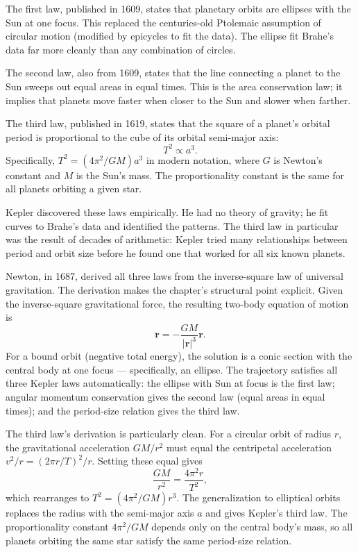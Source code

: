 The first law, published in 1609, states that planetary orbits are ellipses
with the Sun at one focus. This replaced the centuries-old Ptolemaic
assumption of circular motion (modified by epicycles to fit the data). The
ellipse fit Brahe's data far more cleanly than any combination of circles.

The second law, also from 1609, states that the line connecting a planet
to the Sun sweeps out equal areas in equal times. This is the area
conservation law; it implies that planets move faster when closer to the
Sun and slower when farther.

The third law, published in 1619, states that the square of a planet's
orbital period is proportional to the cube of its orbital semi-major axis:
\[
T^2 \propto a^3.
\label{eq:chapter6-kepler-third}
\]
Specifically, $T^2 = (4\pi^2/GM) a^3$ in modern notation, where $G$ is
Newton's constant and $M$ is the Sun's mass. The proportionality constant
is the same for all planets orbiting a given star.

Kepler discovered these laws empirically. He had no theory of gravity; he
fit curves to Brahe's data and identified the patterns. The third law in
particular was the result of decades of arithmetic: Kepler tried many
relationships between period and orbit size before he found one that worked
for all six known planets.

Newton, in 1687, derived all three laws from the inverse-square law of
universal gravitation. The derivation makes the chapter's structural point
explicit. Given the inverse-square gravitational force, the resulting
two-body equation of motion is
\[
\ddot{\mathbf{r}} = -\frac{GM}{|\mathbf{r}|^3} \mathbf{r}.
\]
For a bound orbit (negative total energy), the solution is a conic section
with the central body at one focus --- specifically, an ellipse. The
trajectory satisfies all three Kepler laws automatically: the ellipse with
Sun at focus is the first law; angular momentum conservation gives the
second law (equal areas in equal times); and the period-size relation
gives the third law.

The third law's derivation is particularly clean. For a circular orbit of
radius $r$, the gravitational acceleration $GM/r^2$ must equal the
centripetal acceleration $v^2/r = (2\pi r/T)^2/r$. Setting these equal
gives
\[
\frac{GM}{r^2} = \frac{4\pi^2 r}{T^2},
\]
which rearranges to $T^2 = (4\pi^2/GM) r^3$. The generalization to
elliptical orbits replaces the radius with the semi-major axis $a$ and
gives Kepler's third law. The proportionality constant $4\pi^2/GM$
depends only on the central body's mass, so all planets orbiting the
same star satisfy the same period-size relation.

